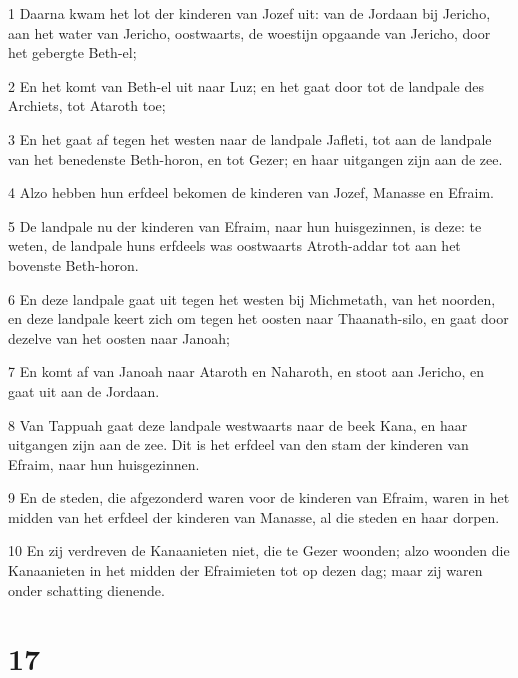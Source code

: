 \par 1 Daarna kwam het lot der kinderen van Jozef uit: van de Jordaan bij Jericho, aan het water van Jericho, oostwaarts, de woestijn opgaande van Jericho, door het gebergte Beth-el;
\par 2 En het komt van Beth-el uit naar Luz; en het gaat door tot de landpale des Archiets, tot Ataroth toe;
\par 3 En het gaat af tegen het westen naar de landpale Jafleti, tot aan de landpale van het benedenste Beth-horon, en tot Gezer; en haar uitgangen zijn aan de zee.
\par 4 Alzo hebben hun erfdeel bekomen de kinderen van Jozef, Manasse en Efraim.
\par 5 De landpale nu der kinderen van Efraim, naar hun huisgezinnen, is deze: te weten, de landpale huns erfdeels was oostwaarts Atroth-addar tot aan het bovenste Beth-horon.
\par 6 En deze landpale gaat uit tegen het westen bij Michmetath, van het noorden, en deze landpale keert zich om tegen het oosten naar Thaanath-silo, en gaat door dezelve van het oosten naar Janoah;
\par 7 En komt af van Janoah naar Ataroth en Naharoth, en stoot aan Jericho, en gaat uit aan de Jordaan.
\par 8 Van Tappuah gaat deze landpale westwaarts naar de beek Kana, en haar uitgangen zijn aan de zee. Dit is het erfdeel van den stam der kinderen van Efraim, naar hun huisgezinnen.
\par 9 En de steden, die afgezonderd waren voor de kinderen van Efraim, waren in het midden van het erfdeel der kinderen van Manasse, al die steden en haar dorpen.
\par 10 En zij verdreven de Kanaanieten niet, die te Gezer woonden; alzo woonden die Kanaanieten in het midden der Efraimieten tot op dezen dag; maar zij waren onder schatting dienende.

\chapter{17}

